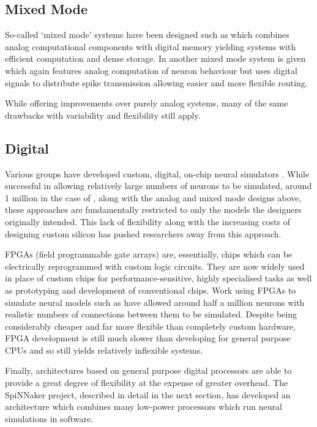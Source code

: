 		\subsection{Mixed Mode}
			
			So-called `mixed mode' systems have been designed such as
			\cite{heittmann02} which combines analog computational components with
			digital memory yielding systems with efficient computation and dense
			storage. In \cite{murray91} another mixed mode system is given which again
			features analog computation of neuron behaviour but uses digital signals
			to distribute spike transmission allowing easier and more flexible routing.
			
			While offering improvements over purely analog systems, many of the same
			drawbacks with variability and flexibility still apply.
		
		\subsection{Digital}
			
			Various groups have developed custom, digital, on-chip neural simulators
			\cite{prange93,jahnke96,schoenauer99,mehrtash03}. While successful in
			allowing relatively large numbers of neurons to be simulated, around 1
			million in the case of \cite{mehrtash03}, along with the analog and mixed
			mode designs above, these approaches are fundamentally restricted to only
			the models the designers originally intended. This lack of flexibility
			along with the increasing costs of designing custom silicon has pushed
			researchers away from this approach.
			
			FPGAs (field programmable gate arrays) are, essentially, chips which can
			be electrically reprogrammed with custom logic circuits. They are now
			widely used in place of custom chips for performance-sensitive, highly
			specialised tasks as well as prototyping and development of conventional
			chips. Work using FPGAs to simulate neural models such as
			\cite{hellmich05} have allowed around half a million neurons with
			realistic numbers of connections between them to be simulated. Despite
			being considerably cheaper and far more flexible than completely custom
			hardware, FPGA development is still much slower than developing for
			general purpose CPUs and so still yields relatively inflexible systems.
			
			Finally, architectures based on general purpose digital processors are
			able to provide a great degree of flexibility at the expense of greater
			overhead\cite{furber07}. The SpiNNaker project, described in detail in the
			next section, has developed an architecture which combines many low-power
			processors which run neural simulations in software.
	
